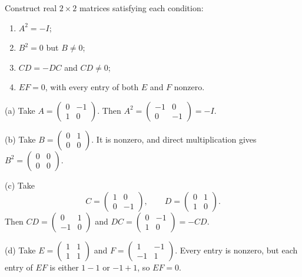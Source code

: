 \begin{problem}\label{ex:01:matrix-constructions}
Construct real $2\times2$ matrices satisfying each condition:
\begin{enumerate}
\item $A^2=-I$;
\item $B^2=0$ but $B\ne0$;
\item $CD=-DC$ and $CD\ne0$;
\item $EF=0$, with every entry of both $E$ and $F$ nonzero.
\end{enumerate}
\end{problem}
\begin{solution}
(a) Take $A=\begin{pmatrix}0&-1\\1&0\end{pmatrix}$. Then
$A^2=\begin{pmatrix}-1&0\\0&-1\end{pmatrix}=-I$.

(b) Take $B=\begin{pmatrix}0&1\\0&0\end{pmatrix}$. It is nonzero,
and direct multiplication gives $B^2=\begin{pmatrix}0&0\\0&0\end{pmatrix}$.

(c) Take
\[
C=\begin{pmatrix}1&0\\0&-1\end{pmatrix},\qquad
D=\begin{pmatrix}0&1\\1&0\end{pmatrix}.
\]
Then $CD=\begin{pmatrix}0&1\\-1&0\end{pmatrix}$ and
$DC=\begin{pmatrix}0&-1\\1&0\end{pmatrix}=-CD$.

(d) Take $E=\begin{pmatrix}1&1\\1&1\end{pmatrix}$ and
$F=\begin{pmatrix}1&-1\\-1&1\end{pmatrix}$. Every entry is nonzero,
but each entry of $EF$ is either $1-1$ or $-1+1$, so $EF=0$.
\end{solution}

